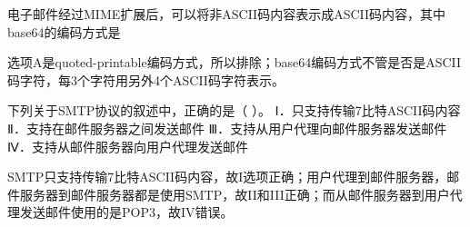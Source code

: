 \question 电子邮件经过MIME扩展后，可以将非ASCII码内容表示成ASCII码内容，其中base64的编码方式是
\par{}
\begin{solution}选项A是quoted-printable编码方式，所以排除；base64编码方式不管是否是ASCII码字符，每3个字符用另外4个ASCII码字符表示。
\end{solution}
\question 下列关于SMTP协议的叙述中，正确的是（ ）。 Ⅰ．只支持传输7比特ASCII码内容
Ⅱ．支持在邮件服务器之间发送邮件 Ⅲ．支持从用户代理向邮件服务器发送邮件
Ⅳ．支持从邮件服务器向用户代理发送邮件
\par{}
\begin{solution}SMTP只支持传输7比特ASCII码内容，故I选项正确；用户代理到邮件服务器，邮件服务器到邮件服务器都是使用SMTP，故II和III正确；而从邮件服务器到用户代理发送邮件使用的是POP3，故IV错误。
\end{solution}

